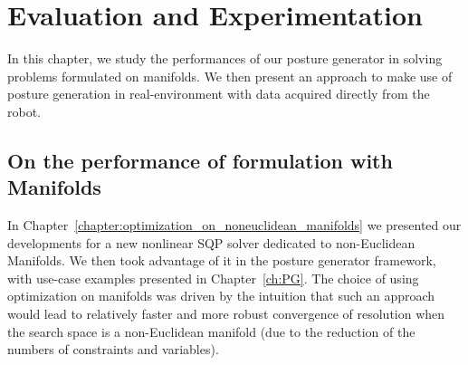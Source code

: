 

\chapter{Evaluation and Experimentation}
\label{cha:evaluation_and_experimentation}

\graphicspath{{Chapter6-Evaluation/Figs/}}

In this chapter, we study the performances of our posture generator in solving problems formulated on manifolds. We then present an approach to make use of posture generation in real-environment with data acquired directly from the robot.

\section{On the performance of formulation with Manifolds}
\label{sec:On_the_performance_of_formulation_with_manifolds}

In Chapter~\ref{chapter:optimization_on_noneuclidean_manifolds} we presented our developments for a new nonlinear SQP solver dedicated to non-Euclidean Manifolds.
We then took advantage of it in the posture generator framework, with use-case examples presented in Chapter~\ref{ch:PG}.
The choice of using optimization on manifolds was driven by the intuition that such an approach would lead to relatively faster and more robust convergence of resolution when the search space is a non-Euclidean manifold (due to the reduction of the numbers of constraints and variables).


